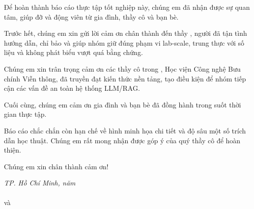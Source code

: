 \begin{acknowledgments}
\setlength{\parskip}{6pt}
Để hoàn thành báo cáo thực tập tốt nghiệp này, chúng em đã nhận được sự quan tâm, giúp đỡ và động viên từ gia đình, thầy cô và bạn bè.

Trước hết, chúng em xin gửi lời cảm ơn chân thành đến thầy \textbf{\supervisor}, người đã tận tình hướng dẫn, chỉ bảo và giúp nhóm giữ đúng phạm vi lab-scale, trung thực với số liệu và không phát biểu vượt quá bằng chứng.

Chúng em xin trân trọng cảm ơn các thầy cô trong \faculty, Học viện Công nghệ Bưu chính Viễn thông, đã truyền đạt kiến thức nền tảng, tạo điều kiện để nhóm tiếp cận các vấn đề an toàn hệ thống LLM/RAG.

Cuối cùng, chúng em cảm ơn gia đình và bạn bè đã đồng hành trong suốt thời gian thực tập.

Báo cáo chắc chắn còn hạn chế về hình minh họa chi tiết và độ sâu một số trích dẫn học thuật. Chúng em rất mong nhận được góp ý của quý thầy cô để hoàn thiện.

Chúng em xin chân thành cảm ơn!

\vspace{2cm}
\begin{flushright}
    \textit{TP. Hồ Chí Minh, năm \yearsubmit} \\
     \\[2.5cm]
    \textbf{\studentname} và \textbf{\studentnametwo}\\
\end{flushright}
\end{acknowledgments}
